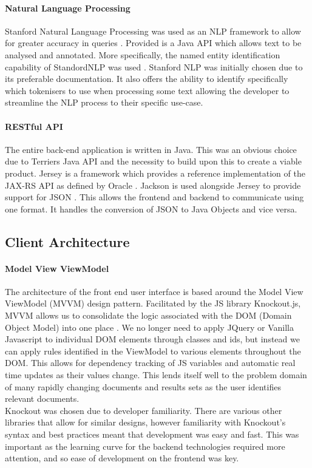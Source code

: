 \documentclass{l4proj}
\begin{document}
\paragraph{Natural Language Processing}
Stanford Natural Language Processing was used as an NLP framework to allow for greater accuracy in queries \cite{manning-EtAl:2014:P14-5}. Provided is a Java API which allows text to be analysed and annotated. More specifically, the named entity identification capability of StandordNLP was used \cite{finkel2005incorporating}.
Stanford NLP was initially chosen due to its preferable documentation. It also offers the ability to identify specifically which tokenisers to use when processing some text allowing the developer to streamline the NLP process to their specific use-case.

\paragraph{RESTful API}
The entire back-end application is written in Java. This was an obvious choice due to Terriers Java API and the necessity to build upon this to create a viable product.
Jersey is a framework which provides a reference implementation of the JAX-RS API as defined by Oracle \cite{jersey} \cite{jaxrsapi}.
Jackson is used alongside Jersey to provide support for JSON \cite{jackson}. This allows the frontend and backend to communicate using one format. It handles the conversion of JSON to Java Objects and vice versa.

\subsection{Client Architecture}
\paragraph{Model View ViewModel}
The architecture of the front end user interface is based around the Model View ViewModel (MVVM) design pattern. Facilitated by the JS library Knockout.js, MVVM allows us to consolidate the logic associated with the DOM (Domain Object Model) into one place \cite{knockout}.
We no longer need to apply JQuery or Vanilla Javascript to individual DOM elements through classes and ids, but instead we can apply rules identified in the ViewModel to various elements throughout the DOM. This allows for dependency tracking of JS variables and automatic real time updates as their values change.
This lends itself well to the problem domain of many rapidly changing documents and results sets as the user identifies relevant documents. \\
Knockout was chosen due to developer familiarity. There are various other libraries that allow for similar designs, however familiarity with Knockout's syntax and best practices meant that development was easy and fast.
This was important as the learning curve for the backend technologies required more attention, and so ease of development on the frontend was key.
\end{document}
